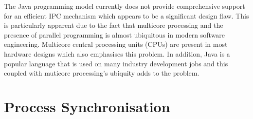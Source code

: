 \documentclass[12pt,a4paper,oneside]{article}
\begin{document}
\begin{spacing}{1.4}
The Java programming model currently does not provide comprehensive support for an efficient IPC mechanism which appears to be a significant design flaw. This is particularly apparent due to the fact that multicore processing and the presence of parallel programming is almost ubiquitous in modern software engineering. Multicore central processing units (CPUs) are present in most hardware designs which also emphasises this problem. In addition, Java is a popular language that is used on many industry development jobs and this coupled with muticore processing's ubiquity adds to the problem.  
\end{spacing}

\section{Process Synchronisation}
\end{document}
